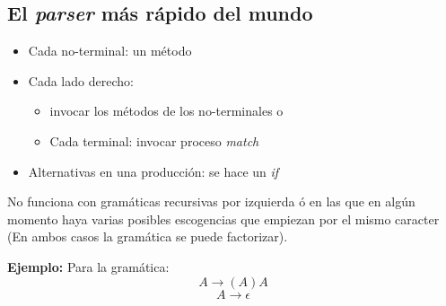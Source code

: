 \documentclass[10pt,letterpaper,twocolumn]{article}
\newcommand{\codigofuente}[1]{

\dotfill
}
\begin{document}
\codigofuente{./src/misc/subsets_of_mask.cpp}

\subsection{El \textit{parser} más rápido del mundo}
\begin{itemize}
\item Cada no-terminal: un método
\item Cada lado derecho:
  \begin{itemize}
  \item invocar los métodos de los no-terminales o
  \item Cada terminal: invocar proceso \textit{match}
  \end{itemize}
\item Alternativas en una producción: se hace un \textit{if}
\end{itemize}
\medskip
No funciona con gramáticas recursivas por izquierda ó en las que en algún momento haya
varias posibles escogencias que empiezan por el mismo caracter (En ambos casos la gramática se puede factorizar).

\medskip
\textbf{Ejemplo:} Para la gramática:
$$
A \longrightarrow (A)A
$$ $$
A \longrightarrow \epsilon
$$

\codigofuente{./src/misc/parser_recursivo_desc.cpp}
\end{document}
